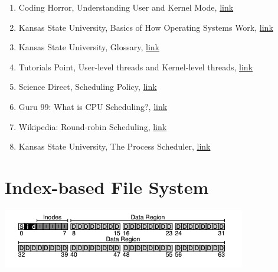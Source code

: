 \documentclass[12pt]{article}
\begin{document}
\begin{enumerate}[1)]
    \item Coding Horror, Understanding User and Kernel Mode, \href{https://blog.codinghorror.com/understanding-user-and-kernel-mode/}{link}
    \item Kansas State University, Basics of How Operating Systems Work, \href{http://faculty.salina.k-state.edu/tim/ossg/Introduction/OSworking.html#:~:text=Interrupts%20are%20signals%20sent%20to,part%20of%20the%20operating%20system.&text=Hardware%20Interupts%20are%20generated%20by,some%20attention%20from%20the%20OS.}{link}
    \item Kansas State University, Glossary, \href{http://faculty.salina.k-state.edu/tim/ossg/glossary.html#term-context-switch}{link}
    \item Tutorials Point, User-level threads and Kernel-level threads, \href{https://www.tutorialspoint.com/user-level-threads-and-kernel-level-threads}{link}
    \item Science Direct, Scheduling Policy, \href{https://www.sciencedirect.com/topics/computer-science/scheduling-policy#:~:text=Scheduling%20policies%20are%20algorithms%20for,nature%20of%20applications%20%5B1%5D.}{link}
    \item Guru 99: What is CPU Scheduling?, \href{https://www.guru99.com/cpu-scheduling-algorithms.html#8}{link}
    \item Wikipedia: Round-robin Scheduling, \href{https://en.wikipedia.org/wiki/Round-robin_scheduling}{link}
    \item Kansas State University, The Process Scheduler, \href{http://faculty.salina.k-state.edu/tim/ossg/Process/scheduler/scheduler.html#:~:text=CPU%20Bound%20processes%20are%20ones,the%20life%20of%20the%20process.}{link}
\end{enumerate}

\pagebreak

\section*{Index-based File System}

\begin{center}

\includegraphics[width=\linewidth]{images/midterm_2_solution_20.png}
\end{center}
\end{document}

